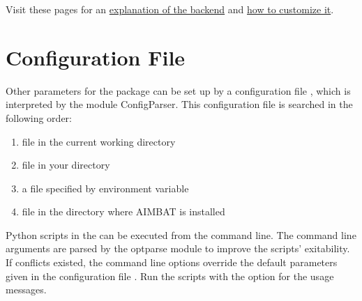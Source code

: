 \documentclass[letterpaper,10pt,english]{sphinxmanual}
\begin{document}
Visit these pages for an \href{http://matplotlib.org/faq/usage\_faq.html\#what-is-a-backend}{explanation of the backend} and \href{http://matplotlib.org/users/customizing.html\#customizing-matplotlib}{how to customize it}.


\section{Configuration File}
\label{docfiles/parameterConfiguration:configuration-file}
Other parameters for the package can be set up by a configuration file , which is interpreted by the module ConfigParser. This configuration file is searched in the following order:
\begin{enumerate}
\item {} 
file  in the current working directory

\item {} 
file  in your  directory

\item {} 
a file specified by environment variable 

\item {} 
file  in the directory where AIMBAT is installed

\end{enumerate}

Python scripts in the  can be executed from the command line. The command line arguments are parsed by the optparse module to improve the scripts' exitability. If conflicts existed, the command line options override the default parameters given in the configuration file . Run the scripts with the  option for the usage messages.
\end{document}
